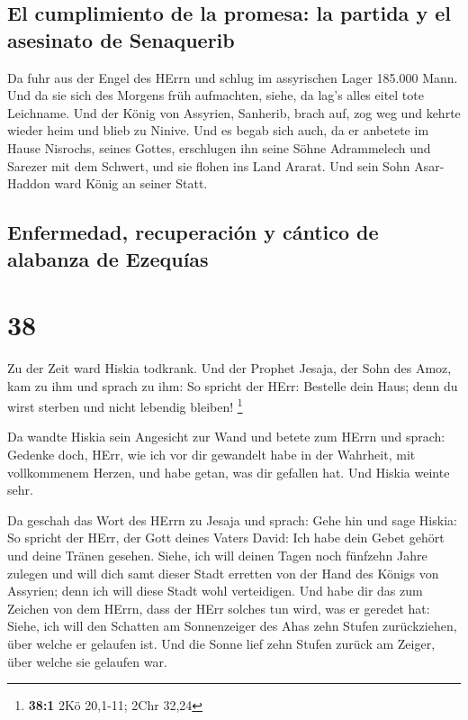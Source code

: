 \hypertarget{el-cumplimiento-de-la-promesa-la-partida-y-el-asesinato-de-senaquerib}{%
\subsection{El cumplimiento de la promesa: la partida y el asesinato de
Senaquerib}\label{el-cumplimiento-de-la-promesa-la-partida-y-el-asesinato-de-senaquerib}}

 Da fuhr aus der Engel des HErrn und schlug im
assyrischen Lager 185.000 Mann. Und da sie sich des Morgens früh
aufmachten, siehe, da lag's alles eitel tote Leichname. 
Und der König von Assyrien, Sanherib, brach auf, zog weg und kehrte
wieder heim und blieb zu Ninive.  Und es begab sich auch,
da er anbetete im Hause Nisrochs, seines Gottes, erschlugen ihn seine
Söhne Adrammelech und Sarezer mit dem Schwert, und sie flohen ins Land
Ararat. Und sein Sohn Asar-Haddon ward König an seiner Statt.

\hypertarget{enfermedad-recuperaciuxf3n-y-cuxe1ntico-de-alabanza-de-ezequuxedas}{%
\subsection{Enfermedad, recuperación y cántico de alabanza de
Ezequías}\label{enfermedad-recuperaciuxf3n-y-cuxe1ntico-de-alabanza-de-ezequuxedas}}

\hypertarget{section-37}{%
\section{38}\label{section-37}}

 Zu der Zeit ward Hiskia todkrank. Und der Prophet Jesaja,
der Sohn des Amoz, kam zu ihm und sprach zu ihm: So spricht der HErr:
Bestelle dein Haus; denn du wirst sterben und nicht lebendig bleiben!
\footnote{\textbf{38:1} 2Kö 20,1-11; 2Chr 32,24}

 Da wandte Hiskia sein Angesicht zur Wand und betete zum
HErrn  und sprach: Gedenke doch, HErr, wie ich vor dir
gewandelt habe in der Wahrheit, mit vollkommenem Herzen, und habe getan,
was dir gefallen hat. Und Hiskia weinte sehr.

 Da geschah das Wort des HErrn zu Jesaja und sprach:
 Gehe hin und sage Hiskia: So spricht der HErr, der Gott
deines Vaters David: Ich habe dein Gebet gehört und deine Tränen
gesehen. Siehe, ich will deinen Tagen noch fünfzehn Jahre zulegen
 und will dich samt dieser Stadt erretten von der Hand des
Königs von Assyrien; denn ich will diese Stadt wohl verteidigen.
 Und habe dir das zum Zeichen von dem HErrn, dass der HErr
solches tun wird, was er geredet hat:  Siehe, ich will den
Schatten am Sonnenzeiger des Ahas zehn Stufen zurückziehen, über welche
er gelaufen ist. Und die Sonne lief zehn Stufen zurück am Zeiger, über
welche sie gelaufen war.

